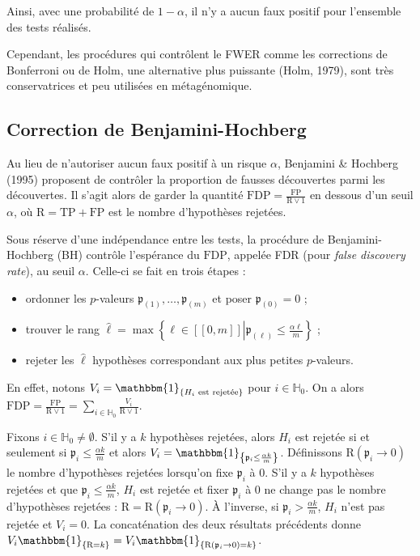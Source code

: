 \documentclass[12pt,a4paper]{reedthesis}
\newcommand \indic {\mathbbm{1}}
\newcommand \pv {\mathfrak{p}}
\theoremstyle{definition}
\theoremstyle{definition}
\theoremstyle{definition}
\theoremstyle{remark}
\begin{document}
Ainsi, avec une probabilité de \(1-\alpha\), il n'y a aucun faux positif pour l'ensemble des tests réalisés.

Cependant, les procédures qui contrôlent le FWER comme les corrections de Bonferroni ou de Holm, une alternative plus puissante (Holm, 1979), sont très conservatrices et peu utilisées en métagénomique.

\hypertarget{correction-de-benjamini-hochberg}{%
\subsection{Correction de Benjamini-Hochberg}\label{correction-de-benjamini-hochberg}}

Au lieu de n'autoriser aucun faux positif à un risque \(\alpha\), Benjamini \& Hochberg (1995) proposent de contrôler la proportion de fausses découvertes parmi les découvertes. Il s'agit alors de garder la quantité \(\text{FDP} = \frac{\text{FP}}{\text{R} \vee 1}\) en dessous d'un seuil \(\alpha\), où \(\text{R} = \text{TP} + \text{FP}\) est le nombre d'hypothèses rejetées.

Sous réserve d'une indépendance entre les tests, la procédure de Benjamini-Hochberg (BH) contrôle l'espérance du \(\text{FDP}\), appelée FDR (pour \emph{false discovery rate}), au seuil \(\alpha\). Celle-ci se fait en trois étapes :
\begin{itemize}
\item
  ordonner les \(p\)-valeurs \(\pv_{(1)}, \ldots, \pv_{(m)}\) et poser \(\pv_{(0)} = 0\) ;
\item
  trouver le rang \(\hat{\ell} = \max\left\{\ell \in [\![0,m]\!] \left| \pv_{(\ell)} \leq \frac{\alpha\ell}{m} \right. \right\}\) ;
\item
  rejeter les \(\hat{\ell}\) hypothèses correspondant aux plus petites \(p\)-valeurs.
\end{itemize}
En effet, notons \(V_i = \indic_{\left\{H_i \text{ est rejetée}\right\}}\) pour \(i \in \mathbb{H}_0\). On a alors
\(\text{FDP} = \frac{\text{FP}}{\text{R} \vee 1} = \sum_{i\in \mathbb{H}_0} \frac{V_i}{\text{R} \vee 1}\).

Fixons \(i\in \mathbb{H}_0 \neq \emptyset\). S'il y a \(k\) hypothèses rejetées, alors \(H_i\) est rejetée si et seulement si \(\pv_i \leq \frac{\alpha k}{m}\) et alors \(V_i = \indic_{\left\{\pv_i \leq \frac{\alpha k}{m}\right\}}\). Définissons \(\text{R}(\pv_i \rightarrow 0)\) le nombre d'hypothèses rejetées lorsqu'on fixe \(\pv_i\) à \(0\). S'il y a \(k\) hypothèses rejetées et que \(\pv_i \leq \frac{\alpha k}{m}\), \(H_i\) est rejetée et fixer \(\pv_i\) à \(0\) ne change pas le nombre d'hypothèses rejetées : \(\text{R} = \text{R}(\pv_i \rightarrow 0)\). À l'inverse, si \(\pv_i > \frac{\alpha k}{m}\), \(H_i\) n'est pas rejetée et \(V_i = 0\). La concaténation des deux résultats précédents donne \(V_i\indic_{\left\{\text{R}=k\right\}} = V_i\indic_{\left\{\text{R}(\pv_i \rightarrow 0) = k\right\}}\).
\end{document}
